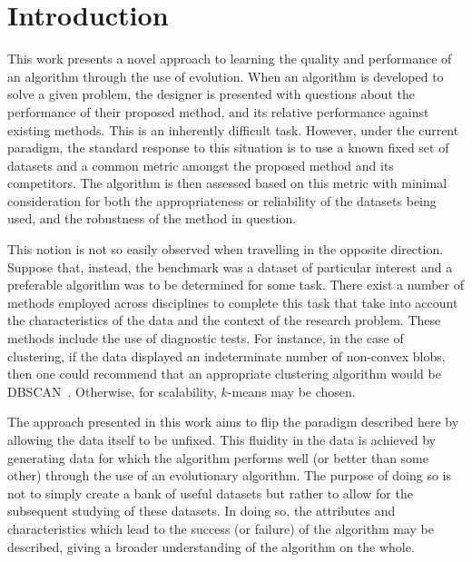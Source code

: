 \section{Introduction}\label{section:introduction}

This work presents a novel approach to learning the quality and performance of
an algorithm through the use of evolution. When an algorithm is developed to
solve a given problem, the designer is presented with questions about the
performance of their proposed method, and its relative performance against
existing methods. This is an inherently difficult task. However, under the
current paradigm, the standard response to this situation is to use a known
fixed set of datasets and a common metric amongst the proposed method and its
competitors. The algorithm is then assessed based on this metric with minimal
consideration for both the appropriateness or reliability of the datasets being
used, and the robustness of the method in question.

This notion is not so easily observed when travelling in the opposite direction.
Suppose that, instead, the benchmark was a dataset of particular interest and a
preferable algorithm was to be determined for some task. There exist a number of
methods employed across disciplines to complete this task that take into account
the characteristics of the data and the context of the research problem. These
methods include the use of diagnostic tests. For instance, in the case of
clustering, if the data displayed an indeterminate number of non-convex blobs,
then one could recommend that an appropriate clustering algorithm would be
DBSCAN~\cite{Ester1996}. Otherwise, for scalability, \(k\)-means may be
chosen.

The approach presented in this work aims to flip the paradigm described here by
allowing the data itself to be unfixed. This fluidity in the data is achieved by
generating data for which the algorithm performs well (or better than some
other) through the use of an evolutionary algorithm. The purpose of doing so is
not to simply create a bank of useful datasets but rather to allow for the
subsequent studying of these datasets. In doing so, the attributes and
characteristics which lead to the success (or failure) of the algorithm may be
described, giving a broader understanding of the algorithm on the whole.


